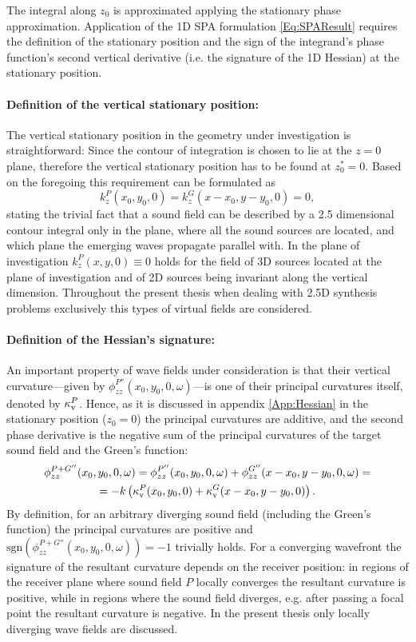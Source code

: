 The integral along $z_0$ is approximated applying the stationary phase approximation.
Application of the 1D SPA formulation \eqref{Eq:SPAResult} requires the definition of the stationary position and the sign of the integrand's phase function's second vertical derivative (i.e. the signature of the 1D Hessian) at the stationary position.

\paragraph{Definition of the vertical stationary position:}
The vertical stationary position in the geometry under investigation is straightforward:
Since the contour of integration is chosen to lie at the $z=0$ plane, therefore the vertical stationary position has to be found at $z_0^* = 0$.
Based on the foregoing this requirement can be formulated as
\begin{equation}
k_z^P(x_0,y_0,0) = k_z^G(x-x_0,y-y_0,0) = 0,
\end{equation}
stating the trivial fact that a sound field can be described by a 2.5 dimensional contour integral only in the plane, where all the sound sources are located, and which plane the emerging waves propagate parallel with.
In the plane of investigation $k_z^P(x,y,0) \equiv 0$ holds for the field of 3D sources located at the plane of investigation and of 2D sources being invariant along the vertical dimension.
Throughout the present thesis when dealing with 2.5D synthesis problems exclusively this types of virtual fields are considered.

\paragraph{Definition of the Hessian's signature:}
An important property of wave fields under consideration is that their vertical curvature---given by $\phi^{P''}_{zz}(x_0,y_0,0,\omega)$---is one of their principal curvatures itself, denoted by $\kappa_\mathrm{v}^P$.
Hence, as it is discussed in appendix \ref{App:Hessian} in the stationary position ($z_0 = 0$) the principal curvatures are additive, and the second phase derivative is the negative sum of the principal curvatures of the target sound field and the Green's function:
\begin{multline}
\phi^{P + G''}_{zz}(x_0,y_0,0,\omega) = \phi^{P''}_{zz}(x_0,y_0,0,\omega) +\phi^{G''}_{zz}(x-x_0,y-y_0,0,\omega) = \\ = -k\left( \kappa_\mathrm{v}^P(x_0,y_0,0) + \kappa_\mathrm{v}^G(x-x_0,y-y_0,0) \right).
\label{Eq:SFS_theory:Curvatures_Addition}
\end{multline}
By definition, for an arbitrary diverging sound field (including the Green's function) the principal curvatures are positive and $\mathrm{sgn} \left( \phi^{P + G''}_{zz}(x_0,y_0,0,\omega) \right) = -1$ trivially holds.
For a converging wavefront the signature of the resultant curvature depends on the receiver position: in regions of the receiver plane where sound field $P$ locally converges the resultant curvature is positive, while in regions where the sound field diverges, e.g. after passing a focal point the resultant curvature is negative.
In the present thesis only locally diverging wave fields are discussed.

